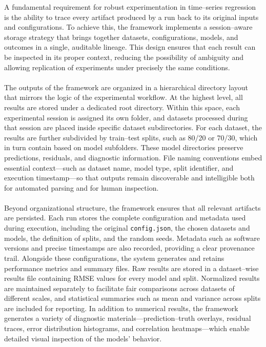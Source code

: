 A fundamental requirement for robust experimentation in time–series regression is the ability to trace every artifact produced by a run back to its original inputs and configurations. To achieve this, the framework implements a session–aware storage strategy that brings together datasets, configurations, models, and outcomes in a single, auditable lineage. This design ensures that each result can be inspected in its proper context, reducing the possibility of ambiguity and allowing replication of experiments under precisely the same conditions.
\\\\The outputs of the framework are organized in a hierarchical directory layout that mirrors the logic of the experimental workflow. At the highest level, all results are stored under a dedicated root directory. Within this space, each experimental session is assigned its own folder, and datasets processed during that session are placed inside specific dataset subdirectories. For each dataset, the results are further subdivided by train–test splits, such as 80/20 or 70/30, which in turn contain based on model subfolders. These model directories preserve predictions, residuals, and diagnostic information. File naming conventions embed essential context—such as dataset name, model type, split identifier, and execution timestamp—so that outputs remain discoverable and intelligible both for automated parsing and for human inspection.
\\\\Beyond organizational structure, the framework ensures that all relevant artifacts are persisted. Each run stores the complete configuration and metadata used during execution, including the original \texttt{config.json}, the chosen datasets and models, the definition of splits, and the random seeds. Metadata such as software versions and precise timestamps are also recorded, providing a clear provenance trail. Alongside these configurations, the system generates and retains performance metrics and summary files. Raw results are stored in a dataset–wise results file containing RMSE values for every model and split. Normalized results are maintained separately to facilitate fair comparisons across datasets of different scales, and statistical summaries such as mean and variance across splits are included for reporting. In addition to numerical results, the framework generates a variety of diagnostic materials—prediction–truth overlays, residual traces, error distribution histograms, and correlation heatmaps—which enable detailed visual inspection of the models’ behavior.
